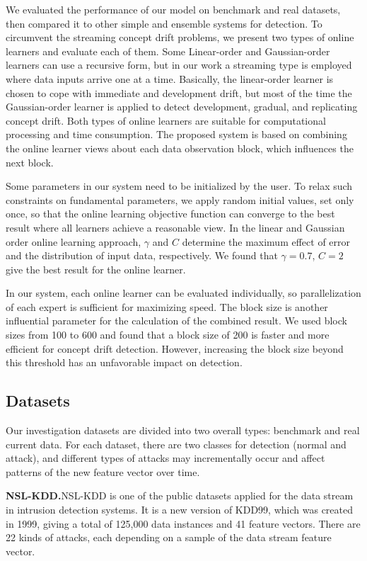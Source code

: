 \documentclass[12pt,a4paper]{article}
\begin{document}
	We evaluated the performance of our model on benchmark and real datasets, then compared it to other simple and ensemble systems for detection. To circumvent the streaming concept drift problems, we present two types of online learners and evaluate each of them. Some Linear-order and Gaussian-order learners can use a recursive form, but in our work a streaming type is employed where data inputs arrive one at a time. Basically, the linear-order learner is chosen to cope with immediate and development drift, but most of the time the Gaussian-order learner is applied to detect development, gradual, and replicating concept drift. Both types of online learners are suitable for computational processing and time consumption. The proposed system is based on combining the online learner views about each data observation block, which influences the next block.
	
	Some parameters in our system need to be initialized by the user. To relax such constraints on fundamental parameters, we apply random initial values, set only once, so that the online learning objective function can converge to the best result where all learners achieve a reasonable view. In the linear and Gaussian order online learning approach, $\gamma$ and $C$ determine the maximum effect of error and the distribution of input data, respectively. We found that $\gamma = 0.7$, $C = 2$ give the best result for the online learner.
	
	In our system, each online learner can be evaluated individually, so parallelization of each expert is sufficient for maximizing speed. The block size is another influential parameter for the calculation of the combined result. We used block sizes from 100 to 600 and found that a block size of 200 is faster and more efficient for concept drift detection. However, increasing the block size beyond this threshold has an unfavorable impact on detection.
	
	\subsection{Datasets}
	
	Our investigation datasets are divided into two overall types: benchmark and real current data. For each dataset, there are two classes for detection (normal and attack), and different types of attacks may incrementally occur and affect patterns of the new feature vector over time.
	
	\medskip
	\noindent\textbf{NSL-KDD.}\quad NSL-KDD is one of the public datasets applied for the data stream in intrusion detection systems. It is a new version of KDD99, which was created in 1999, giving a total of 125,000 data instances and 41 feature vectors. There are 22 kinds of attacks, each depending on a sample of the data stream feature vector.
	
\end{document}
